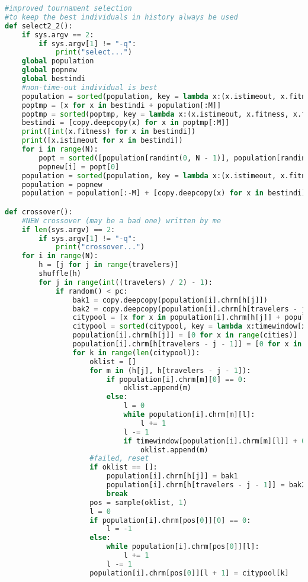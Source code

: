 \documentclass[UTF8,cs4size]{ctexart}
\begin{document}
\begin{lstlisting}[language=Python]
#improved tournament selection
#to keep the best individuals in history always be used
def select2_2():
    if sys.argv == 2:
        if sys.argv[1] != "-q":
            print("select...")
    global population
    global popnew
    global bestindi
    #non-time-out individual is best
    population = sorted(population, key = lambda x:(x.istimeout, x.fitness, x.fitness2))
    poptmp = [x for x in bestindi + population[:M]]
    poptmp = sorted(poptmp, key = lambda x:(x.istimeout, x.fitness, x.fitness2))
    bestindi = [copy.deepcopy(x) for x in poptmp[:M]]
    print([int(x.fitness) for x in bestindi])
    print([x.istimeout for x in bestindi])
    for i in range(N):
        popt = sorted([population[randint(0, N - 1)], population[randint(0, N - 1)]], key = lambda x:(x.istimeout, x.fitness, x.fitness2))
        popnew[i] = popt[0]
    population = sorted(population, key = lambda x:(x.istimeout, x.fitness, x.fitness2))
    population = popnew
    population = population[:-M] + [copy.deepcopy(x) for x in bestindi]

def crossover():
    #NEW crossover (may be a bad one) written by me
    if len(sys.argv) == 2:
        if sys.argv[1] != "-q":
            print("crossover...")
    for i in range(N):
        h = [j for j in range(travelers)]
        shuffle(h)
        for j in range(int((travelers) / 2) - 1):
            if random() < pc:
                bak1 = copy.deepcopy(population[i].chrm[h[j]])
                bak2 = copy.deepcopy(population[i].chrm[h[travelers - j - 1]])
                citypool = [x for x in population[i].chrm[h[j]] + population[i].chrm[h[travelers - j - 1]] if x]
                citypool = sorted(citypool, key = lambda x:timewindow[x])
                population[i].chrm[h[j]] = [0 for x in range(cities)]
                population[i].chrm[h[travelers - j - 1]] = [0 for x in range(cities)]
                for k in range(len(citypool)):
                    oklist = []
                    for m in (h[j], h[travelers - j - 1]):
                        if population[i].chrm[m][0] == 0:
                            oklist.append(m)
                        else:
                            l = 0
                            while population[i].chrm[m][l]:
                                l += 1
                            l -= 1
                            if timewindow[population[i].chrm[m][l]] + 0.5 + installtimelength[population[i].chrm[m][l]] / speed + dist[cities2realcity[population[i].chrm[m][l]]][cities2realcity[citypool[k]]] / speed <= timewindow[citypool[k]] + 0.5:
                                oklist.append(m)
                    #failed, reset
                    if oklist == []:
                        population[i].chrm[h[j]] = bak1
                        population[i].chrm[h[travelers - j - 1]] = bak2
                        break
                    pos = sample(oklist, 1)
                    l = 0
                    if population[i].chrm[pos[0]][0] == 0:
                        l = -1
                    else:
                        while population[i].chrm[pos[0]][l]:
                            l += 1
                        l -= 1
                    population[i].chrm[pos[0]][l + 1] = citypool[k]


\end{lstlisting}
\end{document}
